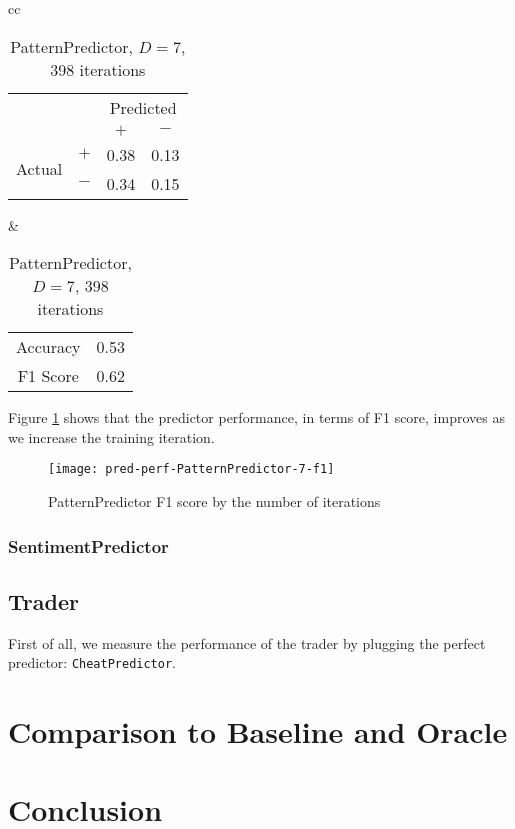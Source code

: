 \documentclass[twocolumn,10pt]{asme2ej}
\begin{document}
\begin{table}
  \begin{tabular}{cc}
    \begin{tabular}{cc|cc}
      & & \multicolumn{2}{c}{Predicted} \\
      & & $+ $ & $-$ \\
      \hline
      \multirow{2}{*}{Actual}
      & $+$ & 0.38 & 0.13 \\
      & $-$ & 0.34 & 0.15 \\
      \hline
    \end{tabular}
    &
    \begin{tabular}{cc}
      Accuracy & 0.53 \\
      F1 Score & 0.62 \\
    \end{tabular}
  \end{tabular}
  \caption{PatternPredictor, $D=7$, 398 iterations}
  \label{pred-perf-PatternPredictor-7-398}
\end{table}

Figure \ref{pred-perf-PatternPredictor-7-f1} shows that the predictor
performance, in terms of F1 score, improves as we increase the
training iteration.

\begin{figure}
  \centering
  \texttt{[image: pred-perf-PatternPredictor-7-f1]}
  \caption{PatternPredictor F1 score by the number of iterations}
  \label{pred-perf-PatternPredictor-7-f1}
\end{figure}

\subsubsection{SentimentPredictor}

\subsection{Trader}

First of all, we measure the performance of the trader by plugging the
perfect predictor: \verb|CheatPredictor|.

\section{Comparison to Baseline and Oracle}

\section{Conclusion}




\end{document}
